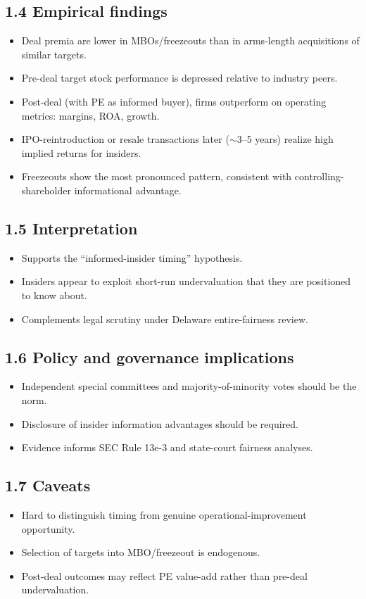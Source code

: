 \documentclass[11pt]{article}
\begin{document}
\subsection*{1.4 Empirical findings}
\begin{itemize}
\item Deal premia are lower in MBOs/freezeouts than in arms-length acquisitions of similar targets.
\item Pre-deal target stock performance is depressed relative to industry peers.
\item Post-deal (with PE as informed buyer), firms outperform on operating metrics: margins, ROA, growth.
\item IPO-reintroduction or resale transactions later ($\sim$3--5 years) realize high implied returns for insiders.
\item Freezeouts show the most pronounced pattern, consistent with controlling-shareholder informational advantage.
\end{itemize}

\subsection*{1.5 Interpretation}
\begin{itemize}
\item Supports the ``informed-insider timing'' hypothesis.
\item Insiders appear to exploit short-run undervaluation that they are positioned to know about.
\item Complements legal scrutiny under Delaware entire-fairness review.
\end{itemize}

\subsection*{1.6 Policy and governance implications}
\begin{itemize}
\item Independent special committees and majority-of-minority votes should be the norm.
\item Disclosure of insider information advantages should be required.
\item Evidence informs SEC Rule 13e-3 and state-court fairness analyses.
\end{itemize}

\subsection*{1.7 Caveats}
\begin{alertbox}
\begin{itemize}
\item Hard to distinguish timing from genuine operational-improvement opportunity.
\item Selection of targets into MBO/freezeout is endogenous.
\item Post-deal outcomes may reflect PE value-add rather than pre-deal undervaluation.
\end{itemize}
\end{alertbox}
\end{document}
